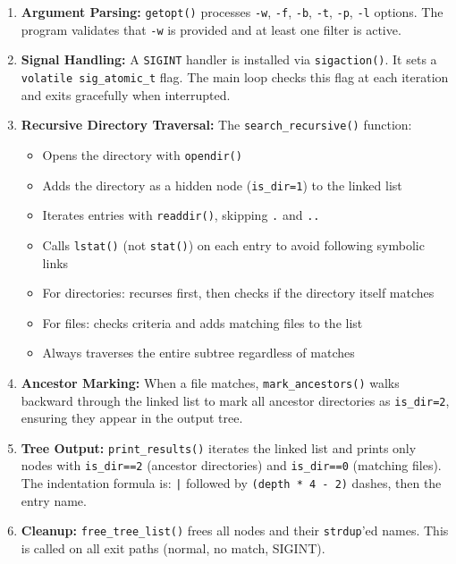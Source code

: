 \documentclass[12pt,a4paper]{article}
\begin{document}
\begin{enumerate}[nosep]
    \item \textbf{Argument Parsing:} \texttt{getopt()} processes \texttt{-w}, \texttt{-f}, \texttt{-b}, \texttt{-t}, \texttt{-p}, \texttt{-l} options. The program validates that \texttt{-w} is provided and at least one filter is active.

    \item \textbf{Signal Handling:} A \texttt{SIGINT} handler is installed via \texttt{sigaction()}. It sets a \texttt{volatile sig\_atomic\_t} flag. The main loop checks this flag at each iteration and exits gracefully when interrupted.

    \item \textbf{Recursive Directory Traversal:} The \texttt{search\_recursive()} function:
    \begin{itemize}[nosep]
        \item Opens the directory with \texttt{opendir()}
        \item Adds the directory as a hidden node (\texttt{is\_dir=1}) to the linked list
        \item Iterates entries with \texttt{readdir()}, skipping \texttt{.} and \texttt{..}
        \item Calls \texttt{lstat()} (not \texttt{stat()}) on each entry to avoid following symbolic links
        \item For directories: recurses first, then checks if the directory itself matches
        \item For files: checks criteria and adds matching files to the list
        \item Always traverses the entire subtree regardless of matches
    \end{itemize}

    \item \textbf{Ancestor Marking:} When a file matches, \texttt{mark\_ancestors()} walks backward through the linked list to mark all ancestor directories as \texttt{is\_dir=2}, ensuring they appear in the output tree.

    \item \textbf{Tree Output:} \texttt{print\_results()} iterates the linked list and prints only nodes with \texttt{is\_dir==2} (ancestor directories) and \texttt{is\_dir==0} (matching files). The indentation formula is: \texttt{|} followed by \texttt{(depth * 4 - 2)} dashes, then the entry name.

    \item \textbf{Cleanup:} \texttt{free\_tree\_list()} frees all nodes and their \texttt{strdup}'ed names. This is called on all exit paths (normal, no match, SIGINT).
\end{enumerate}
\end{document}
